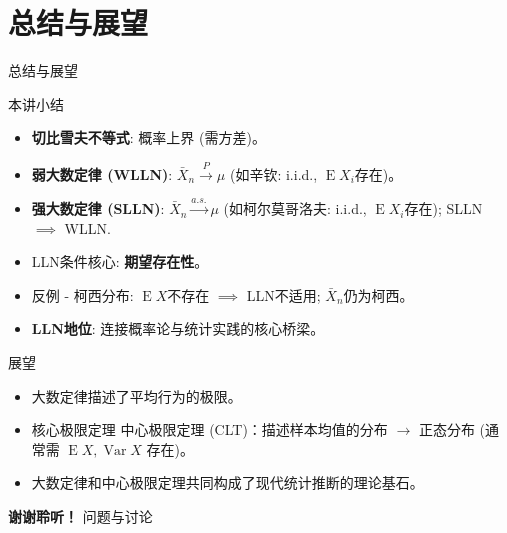 \documentclass[UTF8]{beamer}
\DeclareMathOperator{\E}{\operatorname{E}}
\DeclareMathOperator{\Var}{\operatorname{Var}}
\begin{document}
\section{总结与展望}
\begin{frame}[shrink=15]{总结与展望}
    \begin{block}{本讲小结}
        \begin{itemize}
            \item \textbf{切比雪夫不等式}: 概率上界 (需方差)。
            \item \textbf{弱大数定律 (WLLN)}: $\bar{X}_n \xrightarrow{P} \mu$ (如辛钦: i.i.d., $\E X_i$存在)。
            \item \textbf{强大数定律 (SLLN)}: $\bar{X}_n \xrightarrow{a.s.} \mu$ (如柯尔莫哥洛夫: i.i.d., $\E X_i$存在); SLLN $\implies$ WLLN.
            \item \alert{LLN条件核心}: \textbf{期望存在性}。
            \item \alert{反例 - 柯西分布}: $\E X$不存在 $\implies$ LLN不适用; $\bar{X}_n$仍为柯西。
            \item \textbf{LLN地位}: 连接概率论与统计实践的\alert{核心桥梁}。
        \end{itemize}
    \end{block}
\end{frame}

\begin{frame}
    \begin{alertblock}{展望}
        \begin{itemize}
            \item 大数定律描述了\alert{平均}行为的极限。
            \item 核心极限定理 \alert{中心极限定理 (CLT)}：描述样本均值的\alert{分布} $\rightarrow$ 正态分布 (通常需 $\E X, \Var X$ 存在)。
            \item 大数定律和中心极限定理共同构成了现代统计推断的理论基石。
        \end{itemize}
    \end{alertblock}
\end{frame}

\begin{frame}
    \centering
    \Huge{\bfseries 谢谢聆听！}
    \vspace{1cm}
    \normalsize
    问题与讨论
\end{frame}
\end{document}
